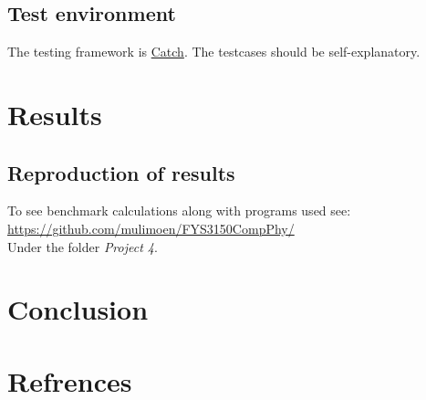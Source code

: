 \documentclass[11pt,a4paper,english]{article}
\numberwithin{equation}{section}
\begin{document}
\subsection{Test environment}

The testing framework is \href{https://github.com/philsquared/Catch}{Catch}.
The testcases should be self-explanatory.


\section{Results}

\subsection{Reproduction of results}

To see benchmark calculations along with programs used see:\\
\url{https://github.com/mulimoen/FYS3150CompPhy/}\\
Under the folder \emph{Project 4}.

\section{Conclusion}

\section{Refrences}
\end{document}
